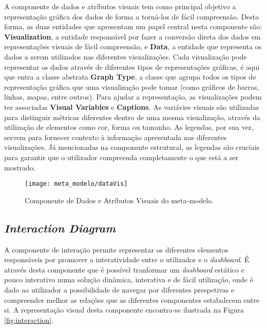 A componente de dados e atríbutos visuais tem como principal objetivo a representação gráfica dos dados de forma a torná-los de fácil compreensão. Desta forma, as duas entidades que apresentam um papel central nesta componente são: \textbf{Visualization}, a entidade responsável por fazer a conversão direta dos dados em representações visuais de fácil compreensão, e \textbf{Data}, a entidade que representa os dados a serem utilizados nas diferentes visualizações. Cada visualização pode representar os dados através de diferentes tipos de representações gráficas, é aqui que entra a classe abstrata \textbf{Graph Type}, a classe que agrupa todos os tipos de representação gráfica que uma visualização pode tomar (como gráficos de barras, linhas, mapas, entre outros). Para ajudar a representação, as visualizações podem ter associadas \textbf{Visual Variables} e \textbf{Captions}. As variávies visuais são utilizadas para distinguir métricas diferentes dentro de uma mesma visualização, através da utilização de elementos como cor, forma ou tamanho. As legendas, por sua vez, servem para fornecer contexto à informação apresentada nas diferentes visualizações. Já mencionadas na componente estrutural, as legendas são cruciais para garantir que o utilizador compreenda completamente o que está a ser mostrado.

\begin{figure}[htbp]
  \texttt{[image: meta\_modelo/dataVis]}
  \centering
  \caption{Componente de Dados e Atríbutos Visuais do meta-modelo.}
  \label{fig:comp_data_vis}
\end{figure}

\subsection{\textit{Interaction Diagram}} %
\label{sub:int_diagram}

A componente de interação permite representar os diferentes elementos responsáveis por promover a interatividade entre o utilizador e o \textit{dashboard}. É através desta componente que é possível tranformar um \textit{dashboard} estático e pouco interativo numa solução dinâmica, interativa e de fácil utilização, onde é dado ao utilizador a possibilidade de navegar por diferentes prespetivas e compreender melhor as relações que as diferentes componentes estabalecem entre si. A representação visual desta componente encontra-se ilustrada na Figura \ref{fig:interaction}.

